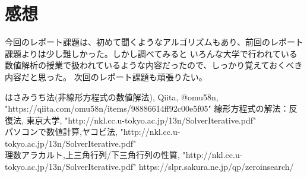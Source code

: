 \documentclass[titlepage]{jsarticle}
\begin{document}
    \section{感想}
	今回のレポート課題は、初めて聞くようなアルゴリズムもあり、前回のレポート課題よりは少し難しかった。しかし調べてみると
	いろんな大学で行われている数値解析の授業で扱われているような内容だったので、しっかり覚えておくべき内容だと思った。
	次回のレポート課題も頑張りたい。

	\begin{thebibliography}{99}
         はさみうち法(非線形方程式の数値解法), Qiita, @omu58n, \\
            "https://qiita.com/omu58n/items/98886614ff92c00e5f05"
         線形方程式の解法：反復法, 東京大学, "http://nkl.cc.u-tokyo.ac.jp/13n/SolverIterative.pdf"\\
         パソコンで数値計算,ヤコビ法, "http://nkl.cc.u-tokyo.ac.jp/13n/SolverIterative.pdf"\\
	   理数アラカルト,上三角行列/下三角行列の性質, "http://nkl.cc.u-tokyo.ac.jp/13n/SolverIterative.pdf"
	https://slpr.sakura.ne.jp/qp/zeroinsearch/
    \end{thebibliography}       
\end{document}
